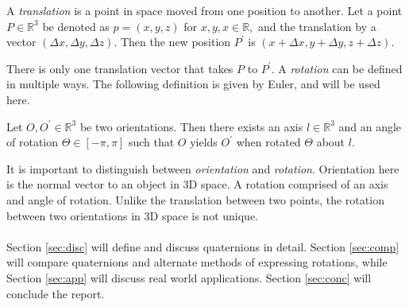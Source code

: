 \begin{defn}[Translation]
A \textit{translation} is a point in space moved from one position to another.
Let a point $P \in \mathbb{R}^3$ be denoted as $p=(x,y,z)$ for $x,y,x \in \mathbb{R},$ and the translation by a vector $(\Delta x, \Delta y, \Delta z)$.
Then the new position $P^\prime$ is $(x + \Delta x, y + \Delta y, z + \Delta z)$.
\end{defn}
There is only one translation vector that takes $P$ to $P^\prime$.
A \textit{rotation} can be defined in multiple ways.
The following definition is given by Euler, and will be used here.

\begin{defn}
Let $O, O^\prime \in \mathbb{R}^3$ be two orientations.
Then there exists an axis $l \in \mathbb{R}^3$ and an angle of rotation $\Theta \in [-\pi, \pi]$ such that $O$ yields $O^\prime$ when rotated $\Theta$ about $l$.
\end{defn}

\noindent It is important to distinguish between \textit{orientation} and \textit{rotation}.
Orientation here is the normal vector to an object in 3D space.
A rotation comprised of an axis and angle of rotation.
Unlike the translation between two points, the rotation between two orientations in 3D space is not unique.
\\ \\
\noindent Section \ref{sec:disc} will define and discuss quaternions in detail.
Section \ref{sec:comp} will compare quaternions and alternate methods of expressing rotations, while Section \ref{sec:app} will discuss real world applications.
Section \ref{sec:conc} will conclude the report.
